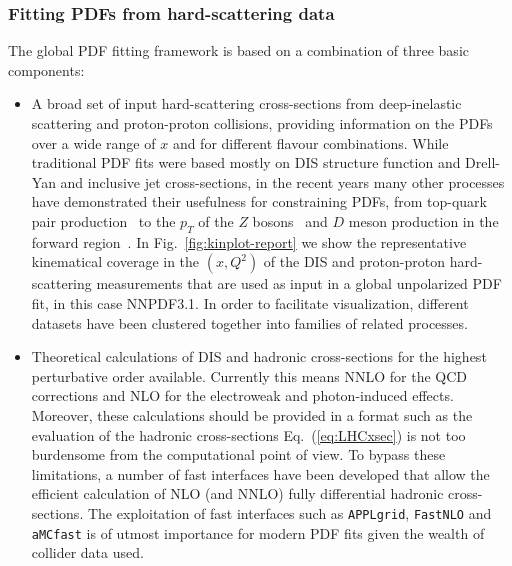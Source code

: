 \subsubsection*{Fitting PDFs from hard-scattering data}

The global PDF fitting framework is based on a combination of three basic components:
\begin{itemize}
\item A broad set of input hard-scattering cross-sections from deep-inelastic
  scattering and proton-proton collisions, providing information on the PDFs
  over a wide range of $x$ and for different flavour combinations.
  While traditional PDF fits were based mostly on DIS structure function and Drell-Yan
  and inclusive jet
  cross-sections, in the recent years many other processes have demonstrated
  their usefulness for constraining PDFs, from top-quark pair production~\cite{Czakon:2016olj}
  to the $p_T$ of the $Z$ bosons~\cite{Boughezal:2017nla}
  and $D$ meson production in the forward region~\cite{Gauld:2016kpd}.
  In Fig.~\ref{fig:kinplot-report} we show the representative kinematical coverage in the
    $(x,Q^2)$ of the DIS and proton-proton hard-scattering measurements that are
    used as input in a global unpolarized PDF fit, in this case NNPDF3.1.
    In order to facilitate visualization, different
    datasets have been clustered together into families of
    related processes.

  \item Theoretical calculations of DIS and hadronic cross-sections
    for the highest perturbative order available.
    Currently this means NNLO for the QCD corrections and NLO
    for the electroweak and photon-induced effects.
    Moreover, these calculations should be provided in
    a format such as the evaluation of the hadronic
    cross-sections Eq.~(\ref{eq:LHCxsec}) is not too burdensome
    from the computational point of view.
    To bypass these limitations, a number of fast interfaces have
    been developed that allow the efficient calculation
    of NLO (and NNLO) fully differential hadronic cross-sections.
    The exploitation of fast interfaces such as {\tt APPLgrid},
    {\tt FastNLO} and {\tt aMCfast} is of utmost importance
    for modern PDF fits given the wealth of collider data used.


\end{itemize}
